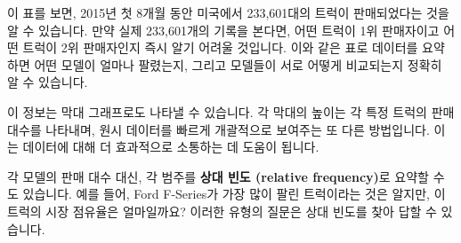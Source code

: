 \documentclass[11pt,a4paper]{article}
\theoremstyle{definition}
\begin{document}
\begin{examplebox}
이 표를 보면, 2015년 첫 8개월 동안 미국에서 233,601대의 트럭이 판매되었다는 것을 알 수 있습니다. 만약 실제 233,601개의 기록을 본다면, 어떤 트럭이 1위 판매자이고 어떤 트럭이 2위 판매자인지 즉시 알기 어려울 것입니다. 이와 같은 표로 데이터를 요약하면 어떤 모델이 얼마나 팔렸는지, 그리고 모델들이 서로 어떻게 비교되는지 정확히 알 수 있습니다.

\begin{center}
\label{fig:bar_graph_count}
\end{center}
이 정보는 막대 그래프로도 나타낼 수 있습니다. 각 막대의 높이는 각 특정 트럭의 판매 대수를 나타내며, 원시 데이터를 빠르게 개괄적으로 보여주는 또 다른 방법입니다. 이는 데이터에 대해 더 효과적으로 소통하는 데 도움이 됩니다.

각 모델의 판매 대수 대신, 각 범주를 \textbf{상대 빈도 (relative frequency)}로 요약할 수도 있습니다. 예를 들어, Ford F-Series가 가장 많이 팔린 트럭이라는 것은 알지만, 이 트럭의 시장 점유율은 얼마일까요? 이러한 유형의 질문은 상대 빈도를 찾아 답할 수 있습니다.
\end{examplebox}
\end{document}
